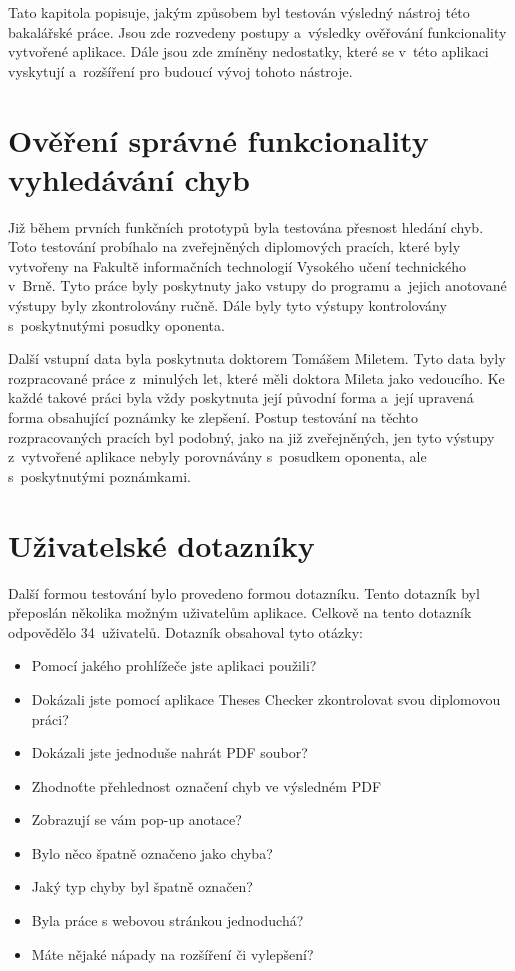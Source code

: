 Tato kapitola popisuje, jakým způsobem byl testován výsledný nástroj této
bakalářské práce. Jsou zde rozvedeny postupy a~výsledky ověřování funkcionality
vytvořené aplikace. Dále jsou zde zmíněny nedostatky, které se v~této aplikaci
vyskytují a~rozšíření pro budoucí vývoj tohoto nástroje. 



\section{Ověření správné funkcionality vyhledávání chyb}
Již během prvních funkčních prototypů byla testována přesnost hledání
chyb. Toto testování probíhalo na zveřejněných diplomových pracích, které byly
vytvořeny na Fakultě informačních technologií Vysokého učení technického v~Brně.
Tyto práce byly poskytnuty jako vstupy do programu a~jejich anotované
výstupy byly zkontrolovány ručně. Dále byly tyto výstupy kontrolovány
s~poskytnutými posudky oponenta.

Další vstupní data byla poskytnuta doktorem Tomášem Miletem. Tyto data
byly rozpracované práce z~minulých let, které měli doktora Mileta jako
vedoucího. Ke každé takové práci byla vždy poskytnuta její původní forma
a~její upravená forma obsahující poznámky ke zlepšení. Postup testování
na těchto rozpracovaných pracích byl podobný, jako na již zveřejněných, 
jen tyto výstupy z~vytvořené aplikace nebyly porovnávány s~posudkem oponenta,
ale s~poskytnutými poznámkami.



\section{Uživatelské dotazníky}
Další formou testování bylo provedeno formou dotazníku.
Tento dotazník byl přeposlán několika možným uživatelům
aplikace. Celkově na tento dotazník odpovědělo
34~uživatelů. Dotazník obsahoval tyto otázky:
\begin{itemize}
    \item Pomocí jakého prohlížeče jste aplikaci použili?
    \item Dokázali jste pomocí aplikace Theses Checker zkontrolovat svou
    diplomovou práci?
    \item Dokázali jste jednoduše nahrát PDF soubor?
    \item Zhodnoťte přehlednost označení chyb ve výsledném PDF
    \item Zobrazují se vám pop-up anotace?
    \item Bylo něco špatně označeno jako chyba?
    \item Jaký typ chyby byl špatně označen?
    \item Byla práce s webovou stránkou jednoduchá?
    \item Máte nějaké nápady na rozšíření či vylepšení?
\end{itemize}

